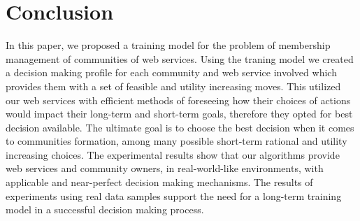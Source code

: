 \documentclass[11pt,onecolumn]{IEEEtran}
\begin{document}
{%
%







\section{Conclusion}\label{s:conclusion}

In this paper, we proposed a training model for the problem of membership management of communities of web services. Using the traning model we created a decision making profile for each community and web service involved which provides them with a set of feasible and utility increasing moves. This utilized our web services with efficient methods of foreseeing how their choices of actions would impact their long-term and short-term goals, therefore they opted for best decision available. The ultimate goal is to choose the best decision when it comes to communities formation, among many possible short-term rational and utility increasing choices. The experimental results show that our algorithms provide web services and community owners, in real-world-like environments, with applicable and near-perfect decision making mechanisms. The results of experiments using real data samples support the need for a long-term training model in a successful decision making process.

}
\end{document}
